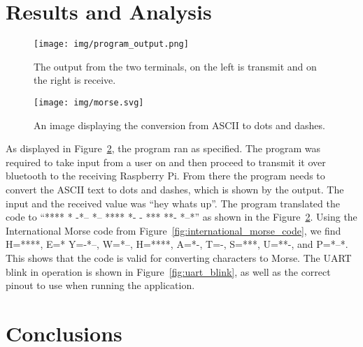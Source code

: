 \documentclass[11pt]{article}
\begin{document}
\section{Results and Analysis}
\label{sec:results_and_analysis}


\begin{figure}[ht]
    \centering
    \texttt{[image: img/program\_output.png]}
    \caption{The output from the two terminals, on the left is transmit and on the right is receive.}
    \label{fig:program_output}
\end{figure}


\begin{figure}[ht]
    \centering
    \texttt{[image: img/morse.svg]}
    \caption{An image displaying the conversion from ASCII to dots and dashes.}
    \label{fig:program_output}
\end{figure}


As displayed in Figure~\ref{fig:program_output}, the program ran as specified.
The program was required to take input from a user on and then proceed to transmit it over bluetooth to the receiving Raspberry Pi.
From there the program needs to convert the ASCII text to dots and dashes, which is shown by the output.
The input and the received value was ``hey whats up''.
The program translated the code to ``**** * -*--   *-- **** *- - ***   **- *--*'' as shown in the Figure~\ref{fig:program_output}.
Using the International Morse code from Figure~\ref{fig:international_morse_code}, we find H=****, E=* Y=-*--, W=*--, H=****, A=*-, T=-, S=***, U=**-, and P=*--*.
This shows that the code is valid for converting characters to Morse.
The UART blink in operation is shown in Figure~\ref{fig:uart_blink}, as well as the correct pinout to use when running the application.


\section{Conclusions}
\label{sec:conclusions}
\end{document}
